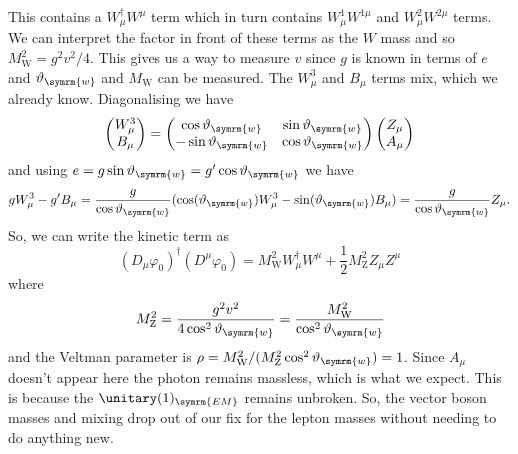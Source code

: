 \documentclass[fleqn]{NotesClass}
\newcommand{\Pparticle}[1]{\mathrm{#1}}
\newcommand{\PZ}{\ensuremath{\Pparticle{Z}}}
\newcommand{\PW}{\ensuremath{\Pparticle{W}}}
\newcommand{\covariantDerivative}{D}
\newcommand{\hermit}{\dagger}
\newcommand{\weinbergangle}{\vartheta_{\symrm{w}}}
\begin{document}
    This contains a \(W_\mu^\hermit W^\mu\) term which in turn contains \(W^1_\mu W^{1\mu}\) and \(W^2_\mu W^{2\mu}\) terms.
    We can interpret the factor in front of these terms as the \(W\) mass and so \(M_{\PW}^2 = g^2v^2/4\).
    This gives us a way to measure \(v\) since \(g\) is known in terms of \(e\) and \(\weinbergangle\) and \(M_{\PW}\) can be measured.
    The \(W_\mu^3\) and \(B_\mu\) terms mix, which we already know.
    Diagonalising we have
    \begin{equation}
        \begin{pmatrix}
            W^3_\mu\\ B_\mu
        \end{pmatrix}
        =
        \begin{pmatrix}
            \cos\weinbergangle & \sin\weinbergangle\\
            -\sin\weinbergangle & \cos\weinbergangle
        \end{pmatrix}
        \begin{pmatrix}
            Z_\mu\\ A_\mu
        \end{pmatrix}
    \end{equation}
    and using \(e = g\sin\weinbergangle = g'\cos\weinbergangle\) we have
    \begin{equation}
        gW^3_\mu - g'B_\mu = \frac{g}{\cos\weinbergangle}(\cos(\weinbergangle) W^3_\mu - \sin(\weinbergangle) B_\mu) = \frac{g}{\cos\weinbergangle}Z_\mu.
    \end{equation}
    So, we can write the kinetic term as
    \begin{equation}
        (\covariantDerivative_\mu \varphi_0)^\hermit (\covariantDerivative^\mu \varphi_0) = M_{\PW}^2 W_\mu^\hermit W^\mu + \frac{1}{2}M_{\PZ}^2Z_\mu Z^\mu
    \end{equation}
    where
    \begin{equation}
        M_{\PZ}^2 = \frac{g^2v^2}{4\cos^2\weinbergangle} = \frac{M_{\PW}^2}{\cos^2\weinbergangle}
    \end{equation}
    and the Veltman parameter is \(\rho = M_{\PW}^2 / (M_{\PZ}^2 \cos^2 \weinbergangle) = 1\).
    Since \(A_\mu\) doesn't appear here the photon remains massless, which is what we expect.
    This is because the \(\unitary(1)_{\symrm{EM}}\) remains unbroken.
    So, the vector boson masses and mixing drop out of our fix for the lepton masses without needing to do anything new.
    
\end{document}
